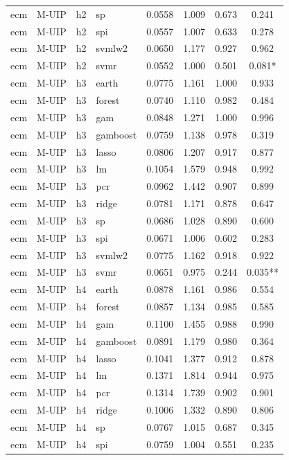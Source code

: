\begin{ThreePartTable}
\begin{longtable}[t]{llclcccc}
ecm & M-UIP & h2 & sp & 0.0558 & 1.009 & 0.673 & 0.241\\
ecm & M-UIP & h2 & spi & 0.0557 & 1.007 & 0.633 & 0.278\\
ecm & M-UIP & h2 & svmlw2 & 0.0650 & 1.177 & 0.927 & 0.962\\
ecm & M-UIP & h2 & svmr & 0.0552 & 1.000 & 0.501 & 0.081*\\
\addlinespace
ecm & M-UIP & h3 & earth & 0.0775 & 1.161 & 1.000 & 0.933\\
ecm & M-UIP & h3 & forest & 0.0740 & 1.110 & 0.982 & 0.484\\
ecm & M-UIP & h3 & gam & 0.0848 & 1.271 & 1.000 & 0.996\\
ecm & M-UIP & h3 & gamboost & 0.0759 & 1.138 & 0.978 & 0.319\\
ecm & M-UIP & h3 & lasso & 0.0806 & 1.207 & 0.917 & 0.877\\
ecm & M-UIP & h3 & lm & 0.1054 & 1.579 & 0.948 & 0.992\\
ecm & M-UIP & h3 & pcr & 0.0962 & 1.442 & 0.907 & 0.899\\
ecm & M-UIP & h3 & ridge & 0.0781 & 1.171 & 0.878 & 0.647\\
ecm & M-UIP & h3 & sp & 0.0686 & 1.028 & 0.890 & 0.600\\
ecm & M-UIP & h3 & spi & 0.0671 & 1.006 & 0.602 & 0.283\\
ecm & M-UIP & h3 & svmlw2 & 0.0775 & 1.162 & 0.918 & 0.922\\
ecm & M-UIP & h3 & svmr & 0.0651 & 0.975 & 0.244 & 0.035**\\
\addlinespace
ecm & M-UIP & h4 & earth & 0.0878 & 1.161 & 0.986 & 0.554\\
ecm & M-UIP & h4 & forest & 0.0857 & 1.134 & 0.985 & 0.585\\
ecm & M-UIP & h4 & gam & 0.1100 & 1.455 & 0.988 & 0.990\\
ecm & M-UIP & h4 & gamboost & 0.0891 & 1.179 & 0.980 & 0.364\\
ecm & M-UIP & h4 & lasso & 0.1041 & 1.377 & 0.912 & 0.878\\
ecm & M-UIP & h4 & lm & 0.1371 & 1.814 & 0.944 & 0.975\\
ecm & M-UIP & h4 & pcr & 0.1314 & 1.739 & 0.902 & 0.901\\
ecm & M-UIP & h4 & ridge & 0.1006 & 1.332 & 0.890 & 0.806\\
ecm & M-UIP & h4 & sp & 0.0767 & 1.015 & 0.687 & 0.345\\
ecm & M-UIP & h4 & spi & 0.0759 & 1.004 & 0.551 & 0.235\\

\end{longtable}
\end{ThreePartTable}
